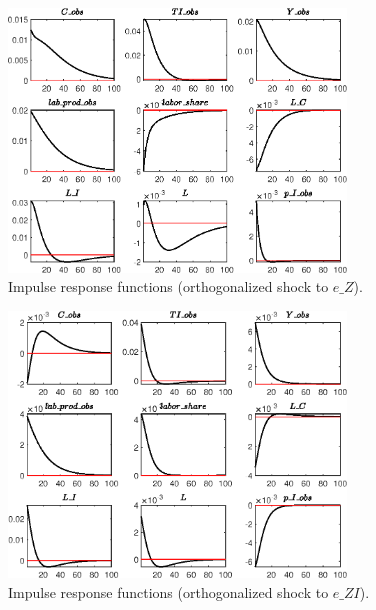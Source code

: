  
\begin{figure}[H]
\centering 
\includegraphics[width=0.80\textwidth]{two_sector_RBC_differentiated_est/graphs/two_sector_RBC_differentiated_est_IRF_e_Z}
\caption{Impulse response functions (orthogonalized shock to $e\_Z$).}
\label{Fig:IRF:e_Z}
\end{figure}
 
\begin{figure}[H]
\centering 
\includegraphics[width=0.80\textwidth]{two_sector_RBC_differentiated_est/graphs/two_sector_RBC_differentiated_est_IRF_e_ZI}
\caption{Impulse response functions (orthogonalized shock to $e\_ZI$).}
\label{Fig:IRF:e_ZI}
\end{figure}
 
 

